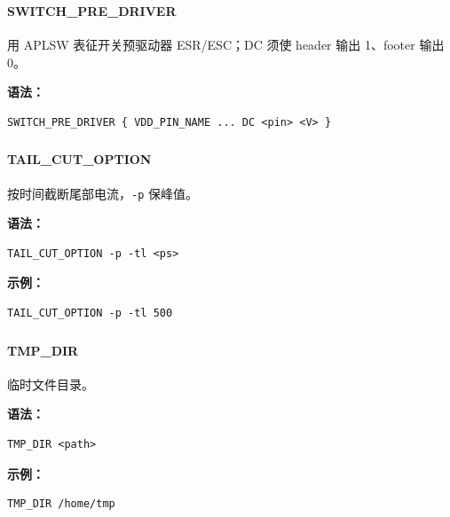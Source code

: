 \subsubsection{}
\paragraph*{SWITCH_PRE_DRIVER}

用 APLSW 表征开关预驱动器 ESR/ESC；DC 须使 header 输出 1、footer 输出 0。

\textbf{语法：}
\begin{lstlisting}
SWITCH_PRE_DRIVER { VDD_PIN_NAME ... DC <pin> <V> }
\end{lstlisting}

\subsubsection{}
\paragraph*{TAIL_CUT_OPTION}

按时间截断尾部电流，\texttt{-p} 保峰值。

\textbf{语法：}
\begin{lstlisting}
TAIL_CUT_OPTION -p -tl <ps>
\end{lstlisting}

\textbf{示例：}
\begin{lstlisting}
TAIL_CUT_OPTION -p -tl 500
\end{lstlisting}

\subsubsection{}
\paragraph*{TMP_DIR}

临时文件目录。

\textbf{语法：}
\begin{lstlisting}
TMP_DIR <path>
\end{lstlisting}

\textbf{示例：}
\begin{lstlisting}
TMP_DIR /home/tmp
\end{lstlisting}

\subsubsection{}
